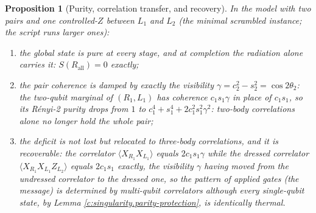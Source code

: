 \documentclass[11pt]{article}
\newtheorem{proposition}[theorem]{Proposition}
\theoremstyle{definition}
\theoremstyle{plain}
\begin{document}
\begin{proposition}[Purity, correlation transfer, and recovery]\label{c:singularity.purity-correlation-transfer-recovery}
In the model with two pairs and one controlled-$Z$ between $L_1$ and $L_2$ (the minimal scrambled instance; the script runs larger ones):
\begin{enumerate}
\item the global state is pure at every stage, and at completion the radiation alone carries it: $S(R_{\mathrm{all}}) = 0$ exactly;
\item the pair coherence is damped by exactly the visibility $\gamma = c_2^2 - s_2^2 = \cos 2\theta_2$: the two-qubit marginal of $(R_1, L_1)$ has coherence $c_1 s_1 \gamma$ in place of $c_1 s_1$, so its R\'enyi-2 purity drops from $1$ to $c_1^4 + s_1^4 + 2 c_1^2 s_1^2 \gamma^2$: two-body correlations alone no longer hold the whole pair;
\item the deficit is not lost but relocated to three-body correlations, and it is recoverable: the correlator $\langle X_{R_1} X_{L_1} \rangle$ equals $2 c_1 s_1 \gamma$ while the dressed correlator $\langle X_{R_1} X_{L_1} Z_{L_2} \rangle$ equals $2 c_1 s_1$ exactly, the visibility $\gamma$ having moved from the undressed correlator to the dressed one, so the pattern of applied gates (the message) is determined by multi-qubit correlators although every single-qubit state, by Lemma \ref{c:singularity.parity-protection}, is identically thermal.
\end{enumerate}
\end{proposition}
\end{document}
